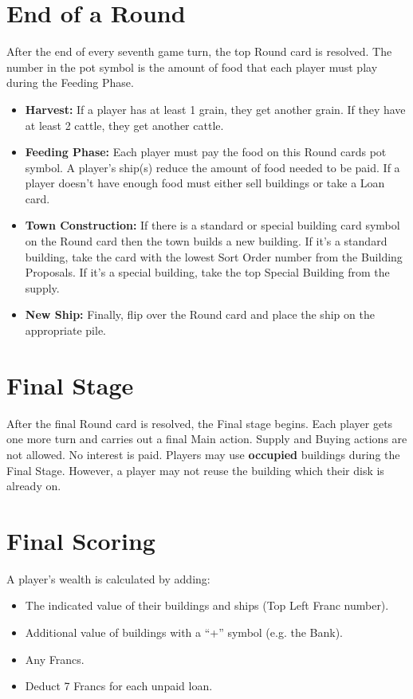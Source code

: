 \documentclass[12pt]{article}
\newenvironment{itemizeCustom}
{\begin{itemize}
  \setlength{\itemsep}{1pt}
  \setlength{\parskip}{0pt}
  \setlength{\parsep}{0pt}}
{\end{itemize}}
\begin{document}
\begin{multicols*}{2}
\section*{End of a Round}
After the end of every seventh game turn, the top Round card is resolved. The number in the pot symbol is the amount of food that each player must play during the Feeding Phase.
\begin{itemizeCustom}
	\item \textbf{Harvest:} If a player has at least 1 grain, they get another grain. If they have at least 2 cattle, they get another cattle.
	\item \textbf{Feeding Phase:} Each player must pay the food on this Round cards pot symbol. A player's ship(s) reduce the amount of food needed to be paid. If a player doesn't have enough food must either sell buildings or take a Loan card.
	\item \textbf{Town Construction:} If there is a standard or special building card symbol on the Round card then the town builds a new building. If it's a standard building, take the card with the lowest Sort Order number from the Building Proposals. If it's a special building, take the top Special Building from the supply.
	\item \textbf{New Ship:} Finally, flip over the Round card and place the ship on the appropriate pile.
\end{itemizeCustom}

\section*{Final Stage}
After the final Round card is resolved, the Final stage begins. Each player gets one more turn and carries out a final Main action. Supply and Buying actions are not allowed. No interest is paid. Players may use \textbf{occupied} buildings during the Final Stage. However, a player may not reuse the building which their disk is already on.

\section*{Final Scoring}
A player's wealth is calculated by adding:
\begin{itemizeCustom}
	\item The indicated value of their buildings and ships (Top Left Franc number).
	\item Additional value of buildings with a ``+'' symbol (e.g. the Bank).
	\item Any Francs.
	\item Deduct 7 Francs for each unpaid loan.
\end{itemizeCustom}

\end{multicols*}
\end{document}
